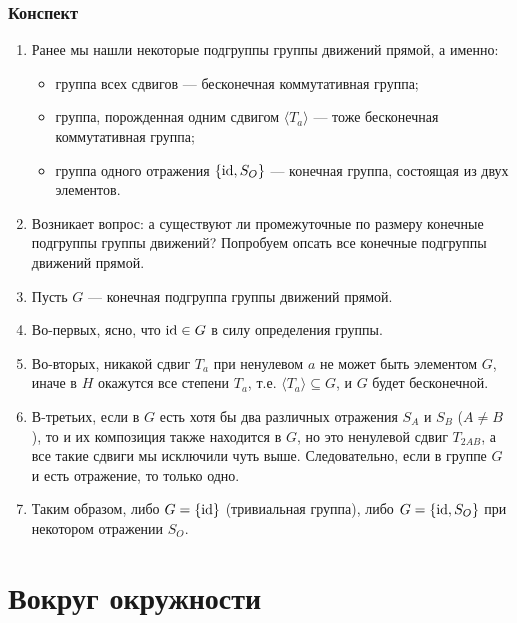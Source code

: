 \subsection*{Конспект}
\begin{enumerate}
\item Ранее мы нашли некоторые подгруппы группы движений прямой, а именно:
\begin{itemize}
\item группа всех сдвигов --- бесконечная коммутативная группа;
\item группа, порожденная одним сдвигом $\langle T_a\rangle$ --- тоже бесконечная коммутативная группа;
\item группа одного отражения $\{\mathrm{id}, S_O\}$ --- конечная группа, состоящая из двух элементов.
\end{itemize}
\item Возникает вопрос: а существуют ли промежуточные по размеру конечные подгруппы группы движений? Попробуем опсать все конечные подгруппы движений прямой.
\item Пусть $G$ --- конечная подгруппа группы движений прямой.
\item Во-первых, ясно, что $\mathrm{id}\in G$ в силу определения группы.
\item Во-вторых, никакой сдвиг $T_a$ при ненулевом $a$ не может быть элементом $G$, иначе в $H$ окажутся все степени $T_a$, т.е. $\langle T_a\rangle \subseteq G$, и $G$ будет бесконечной.
\item В-третьих, если в $G$ есть хотя бы два различных отражения $S_A$ и $S_B$ ($A\ne B$), то и их композиция также находится в $G$, но это ненулевой сдвиг $T_{2AB}$, а все такие сдвиги мы исключили чуть выше. Следовательно, если в группе $G$ и есть отражение, то только одно.
\item Таким образом, либо $G=\{\mathrm{id}\}$ (тривиальная группа), либо $G=\{\mathrm{id}, S_O\}$ при некотором отражении $S_O$.
\end{enumerate}


\chapter{Вокруг окружности}



